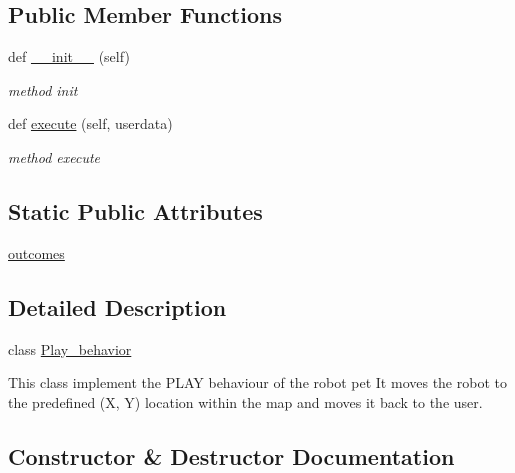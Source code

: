 \subsection*{Public Member Functions}
\begin{DoxyCompactItemize}
\item 
def \hyperlink{classbehavior__manager_1_1Play__behavior_aaa6ce2b1855d0a235e324df41d8519a1}{\+\_\+\+\_\+init\+\_\+\+\_\+} (self)
\begin{DoxyCompactList}\small\item\em method init \end{DoxyCompactList}\item 
def \hyperlink{classbehavior__manager_1_1Play__behavior_a6c5231ed8f406c82e06c741e89b0f666}{execute} (self, userdata)
\begin{DoxyCompactList}\small\item\em method execute \end{DoxyCompactList}\end{DoxyCompactItemize}
\subsection*{Static Public Attributes}
\begin{DoxyCompactItemize}
\item 
\hyperlink{classbehavior__manager_1_1Play__behavior_a11a20a50a946c70874e35be560c006fa}{outcomes}
\end{DoxyCompactItemize}


\subsection{Detailed Description}
class \hyperlink{classbehavior__manager_1_1Play__behavior}{Play\+\_\+behavior} 

This class implement the P\+L\+AY behaviour of the robot pet It moves the robot to the predefined (X, Y) location within the map and moves it back to the user. 

\subsection{Constructor \& Destructor Documentation}

